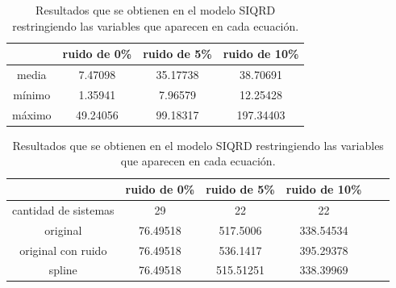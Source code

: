 \begin{table}[!h]
    \centering
    \caption{Resultados que se obtienen en el modelo SIQRD restringiendo las variables que aparecen en cada ecuación.}
    \begin{tabular}{|c|c|c|c|}
        \hline
               & \textbf{ruido de 0\%} & \textbf{ruido de 5\%} & \textbf{ruido de 10\%} \\
        \hline
        media  & 7.47098               & 35.17738              & 38.70691               \\
        \hline
        mínimo & 1.35941               & 7.96579               & 12.25428               \\
        \hline
        máximo & 49.24056              & 99.18317              & 197.34403              \\
        \hline
    \end{tabular}

    \begin{tabular}{|c|c|c|c|c|c|}
        \hline
                             & \textbf{ruido de 0\%} & \textbf{ruido de 5\%} & \textbf{ruido de 10\%} \\
        \hline
        cantidad de sistemas & 29                    & 22                    & 22                     \\
        \hline
        original             & 76.49518              & 517.5006              & 338.54534              \\
        \hline
        original con ruido   & 76.49518              & 536.1417              & 395.29378              \\
        \hline
        spline               & 76.49518              & 515.51251             & 338.39969              \\
        \hline
    \end{tabular}
    \label{table:experiment_SIQRD}
\end{table}

